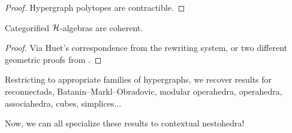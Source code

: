 \begin{proof}
  Hypergraph polytopes are contractible. 
\end{proof}

\begin{thm}
  Categorified $\mathcal{H}$-algebras are coherent.
\end{thm}

\begin{proof}
  Via Huet's correspondence from the rewriting system, or two different geometric proofs from \cite{CLA1}.
\end{proof}

\begin{example}
  Restricting to appropriate families of hypergraphs, we recover results for reconnectads, Batanin--Markl--Obradovic, modular operahedra, operahedra, associahedra, cubes, simplices... 
\end{example}

Now, we can all specialize these results to contextual nestohedra!
